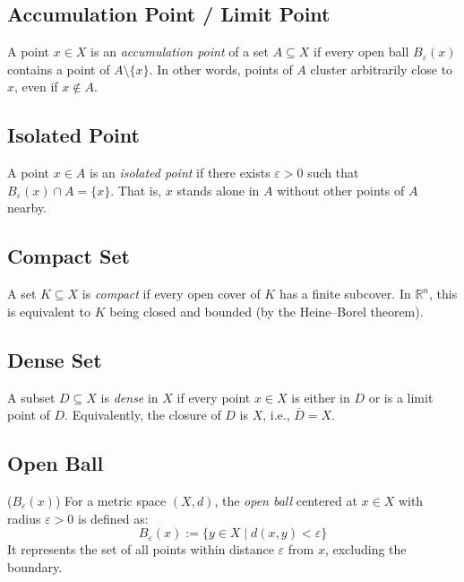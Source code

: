 	 \subsection{Accumulation Point / Limit Point}
	      A point \( x \in X \) is an \emph{accumulation point} of a set \( A \subseteq X \) if every open ball \( B_\varepsilon(x) \) contains a point of \( A \setminus \{x\} \). 
	      In other words, points of \( A \) cluster arbitrarily close to \( x \), even if \( x \notin A \).

	 \subsection{Isolated Point} 
	      A point \( x \in A \) is an \emph{isolated point} if there exists \( \varepsilon > 0 \) such that \( B_\varepsilon(x) \cap A = \{x\} \). 
	      That is, \( x \) stands alone in \( A \) without other points of \( A \) nearby.

	 \subsection{Compact Set} 
	      A set \( K \subseteq X \) is \emph{compact} if every open cover of \( K \) has a finite subcover. 
	      In \(\mathbb{R}^n\), this is equivalent to \( K \) being closed and bounded (by the Heine–Borel theorem).

	 \subsection{Dense Set} 
	      A subset \( D \subseteq X \) is \emph{dense} in \( X \) if every point \( x \in X \) is either in \( D \) or is a limit point of \( D \). 
	      Equivalently, the closure of \( D \) is \( X \), i.e., \( \overline{D} = X \).

	 \subsection{Open Ball} (\( B_\varepsilon(x) \)) 
	      For a metric space \( (X, d) \), the \emph{open ball} centered at \( x \in X \) with radius \( \varepsilon > 0 \) is defined as: 
	      \[
		      B_\varepsilon(x) := \{ y \in X \mid d(x, y) < \varepsilon \}
	      \]
	      It represents the set of all points within distance \( \varepsilon \) from \( x \), excluding the boundary.

\newpage
